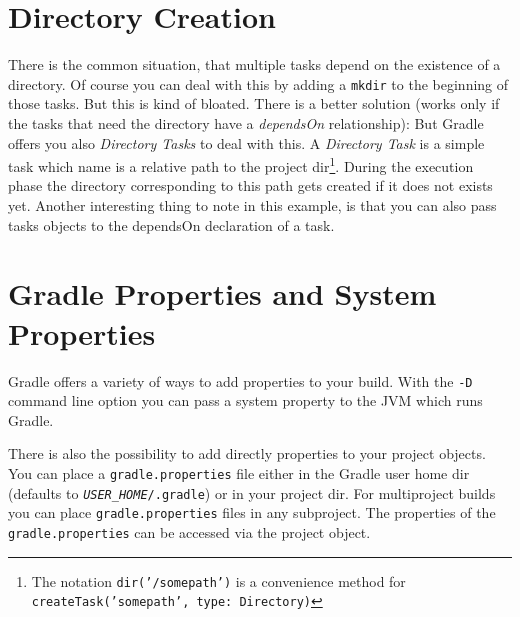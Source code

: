 \section{Directory Creation} %
\label{sec:directory_creation}
There is the common situation, that multiple tasks depend on the existence of a directory. Of course you can deal with this by adding a \texttt{mkdir} to the beginning of those tasks. But this is kind of bloated. 
There is a better solution (works only if the tasks that need the directory have a \emph{dependsOn} relationship):
But Gradle offers you also \emph{Directory Tasks} to deal with this.
A \emph{Directory Task} is a simple task which name is a relative path to the project dir\footnote{The notation \texttt{dir('/somepath')} is a convenience method for \texttt{createTask('somepath', type: Directory)}}. During the execution phase the directory corresponding to this path gets created if it does not exists yet. Another interesting thing to note in this example, is that you can also pass tasks objects to the dependsOn declaration of a task.

\section{Gradle Properties and System Properties} %
\label{sec:gradle_properties_and_system_properties}
Gradle offers a variety of ways to add properties to your build. With the \texttt{-D} command line option you can pass a system property to the JVM which runs Gradle. 

There is also the possibility to add directly properties to your project objects. You can place a \texttt{gradle.properties} file either in the Gradle user home dir (defaults to \texttt{\emph{USER\_HOME}/.gradle}) or in your project dir. For multiproject builds you can place \texttt{gradle.properties} files in any subproject. The properties of the \texttt{gradle.properties} can be accessed via the project object.

